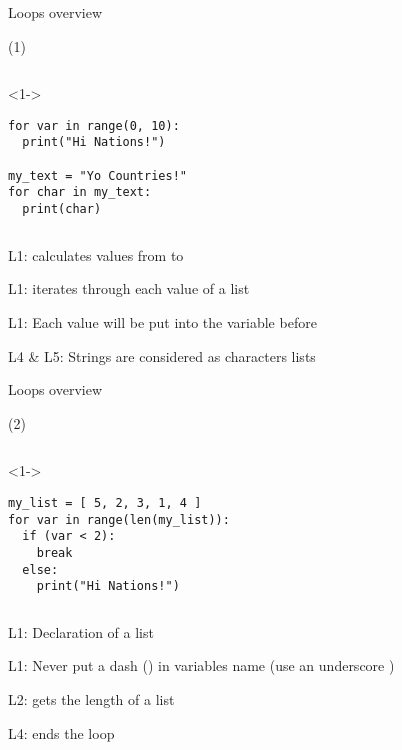 \begin{frame}[fragile]{Loops overview}

   (1)

  \begin{columns}[onlytextwidth]
    \begin{column}{\textwidth}
      \begin{onlyenv}<1->
        \begin{lstlisting}[style=python]
for var in range(0, 10):
  print("Hi Nations!")

my_text = "Yo Countries!"
for char in my_text:
  print(char) \end{lstlisting}
      \end{onlyenv}
    \end{column}
  \end{columns}

   L1:  calculates values from  to 

   L1:  iterates through each value of a list

   L1: Each value will be put into the variable before 

   L4 \& L5: Strings are considered as characters lists

\end{frame}


\begin{frame}[fragile]{Loops overview}

   (2)

  \begin{columns}[onlytextwidth]
    \begin{column}{\textwidth}
      \begin{onlyenv}<1->
        \begin{lstlisting}[style=python]
my_list = [ 5, 2, 3, 1, 4 ]
for var in range(len(my_list)):
  if (var < 2):
    break
  else:
    print("Hi Nations!") \end{lstlisting}
      \end{onlyenv}
    \end{column}
  \end{columns}

   L1: Declaration of a list

   L1: Never put a dash (\TTBF{-}) in variables name (use an underscore \TTBF{\_})

   L2:  gets the length of a list

   L4:  ends the loop

\end{frame}



